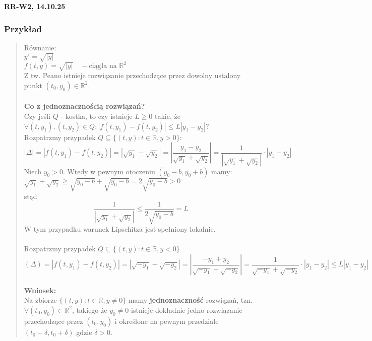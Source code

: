 \documentclass[10pt,a4paper]{article}
\newcommand{\zagadnienie}[3]{%
    \clearpage %
    \noindent\textbf{#1} #2\\
    #3
}
\begin{document}
\zagadnienie{RR-W2, 14.10.25}{}
{
    \subsubsection*{Przykład}
\begin{quote}
Równanie:\\
$y' = \sqrt{|y|}$ \\
$f(t,y) = \sqrt{|y|} \quad - \text{ciągła na } \mathbb{R}^2$ \\
Z tw. Peano istnieje rozwiązanie przechodzące przez dowolny ustalony punkt $(t_0, y_0) \in \mathbb{R}^2$. \\\\
\textbf{Co z jednoznacznością rozwiązań?}\\
Czy jeśli $Q$ - kostka, to czy istnieje $L \ge 0$ takie, że $\forall (t,y_1), (t,y_2) \in Q: |f(t,y_1) - f(t,y_2)| \le L|y_1 - y_2|$? \\
Rozpatrzmy przypadek $Q \subseteq \{(t,y): t \in \mathbb{R}, y > 0 \}$: \\
$$|\Delta| = |f(t,y_1) - f(t,y_2)| = |\sqrt{y_1} - \sqrt{y_2}| = \left| \frac{y_1 - y_2}{\sqrt{y_1} + \sqrt{y_2}} \right| = \frac{1}{|\sqrt{y_1} + \sqrt{y_2}|} \cdot |y_1 - y_2|$$
Niech $y_0 > 0$. Wtedy w pewnym otoczeniu $(y_0 - b, y_0 + b)$ mamy:\\
$\sqrt{y_1} + \sqrt{y_2} \ge \sqrt{y_0 - b} + \sqrt{y_0 - b} = 2\sqrt{y_0 - b} > 0$\\
stąd\\
$$\frac{1}{|\sqrt{y_1} + \sqrt{y_2}|} \le \frac{1}{2\sqrt{y_0 - b}} = L$$
W tym przypadku warunek Lipschitza jest spełniony lokalnie. \\\\
Rozpatrzmy przypadek $Q \subseteq \{(t,y): t \in \mathbb{R}, y < 0\}$\\
$$(\Delta) = |f(t,y_1) - f(t,y_2)| = |\sqrt{-y_1} - \sqrt{-y_2}| = \left| \frac{-y_1 + y_2}{\sqrt{-y_1} + \sqrt{-y_2}} \right| = \frac{1}{\sqrt{-y_1} + \sqrt{-y_2}} \cdot |y_1 - y_2| \leq L|y_1-y_2|$$\\
\textbf{Wniosek:}\\
Na zbiorze $\{(t,y): t \in \mathbb{R}, y \ne 0\}$ mamy \textbf{jednoznaczność} rozwiązań, tzn. $\forall (t_0, y_0) \in \mathbb{R}^2$, takiego że 
$y_0 \ne 0$ istnieje dokładnie jedno rozwiązanie przechodzące przez $(t_0, y_0)$ i określone na pewnym przedziale $(t_0 - \delta, t_0 + \delta)$ gdzie $\delta > 0$.\\


\end{quote}}
\end{document}
